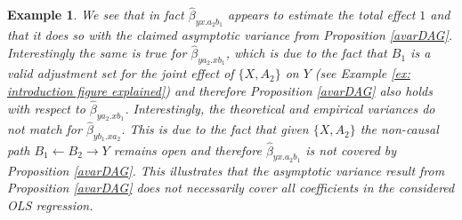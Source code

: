 \documentclass[11pt,a4paper]{article}
\newtheorem{Example}[Satz]{Example}
\theoremstyle{definition}
\theoremstyle{remark}
\begin{document}
\begin{Example}
	We see that in fact $\hat{\beta}_{yx.a_2b_1}$ appears to estimate the total effect $1$ and that it does so with the claimed asymptotic variance from Proposition \ref{avarDAG}. Interestingly the same is true for $\hat{\beta}_{ya_2.xb_1}$, which is due to the fact that $B_1$ is a valid adjustment set for the joint effect of $\{X,A_2\}$ on $Y$ (see Example \ref{ex: introduction figure explained}) and therefore Proposition \ref{avarDAG} also holds with respect to $\hat{\beta}_{ya_2.xb_1}$. Interestingly, the theoretical and empirical variances do not match for $\hat{\beta}_{yb_1.xa_2}$. This is due to the fact that given $\{X,A_2\}$ the non-causal path $B_1 \leftarrow B_2 \rightarrow Y$ remains open and therefore $\hat{\beta}_{yx.a_2b_1}$ is not covered by Proposition \ref{avarDAG}. This illustrates that the asymptotic variance result from Proposition \ref{avarDAG} does not necessarily cover all coefficients in the considered OLS regression.
	
\end{Example}
\end{document}
